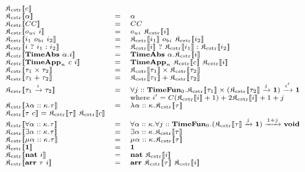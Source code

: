 \documentclass[fleqn]{article}
\begin{document}
\[
\scriptsize
\begin{array}{lcl}
    \cpsc{c} \\
    \cpsc{\alpha} & = & \alpha \\
    \cpsc{CC} & = & CC \\
    \cpsc{o_{ui}~i} & = & o_{ui}~\cpsc{i} \\
    \cpsc{i_1~o_{bi}~i_2} & = & \cpsc{i_1}~o_{bi}~\cpsc{i_2} \\
    \cpsc{i~?~i_1 : i_2} & = & \cpsc{i}~?~\cpsc{i_1} : \cpsc{i_2} \\
    \cpsc{\mathbf{TimeAbs}~\alpha.i} & = & \mathbf{TimeAbs}~\alpha.\cpsc{i} \\
    \cpsc{\mathbf{TimeApp}_n~c~i} & = & \mathbf{TimeApp}_n~\cpsc{c}~\cpsc{i} \\
    \cpsc{\tau_1 \times \tau_2} & = & \cpsc{\tau_1} \times \cpsc{\tau_2} \\
    \cpsc{\tau_1 + \tau_2} & = & \cpsc{\tau_1} + \cpsc{\tau_2} \\
    \cpsc{\tau_1 \xrightarrow{i} \tau_2} & = & \forall j :: \mathbf{TimeFun}_0. \cpsc{\tau_1} \times (\cpsc{\tau_2} \xrightarrow{j} \mathbf{1}) \xrightarrow{i'} \mathbf{1} \\
    & & \mathrm{where}~i'= C(\cpsc{i}+1) + 2\cpsc{i} + 1 + j \\
    \cpsc{\lambda \alpha :: \kappa. \tau} & = & \lambda \alpha :: \kappa. \cpsc{\tau} \\
    \cpsc{\tau~c} = \cpsc{\tau}~\cpsc{c} \\
    \cpsc{\forall \alpha :: \kappa. \tau} & = & \forall \alpha :: \kappa. \forall j :: \mathbf{TimeFun}_0. (\cpsc{\tau} \xrightarrow{j} \mathbf{1}) \xrightarrow{1 + j} \mathbf{void} \\
    \cpsc{\exists \alpha :: \kappa. \tau} & = & \exists \alpha :: \kappa. \cpsc{\tau} \\
    \cpsc{\mu \alpha :: \kappa. \tau} & = & \mu \alpha :: \kappa. \cpsc{\tau} \\
    \cpsc{\mathbf{1}} & = & \mathbf{1} \\
    \cpsc{\mathbf{nat}~i} & = & \mathbf{nat}~\cpsc{i} \\
    \cpsc{\mathbf{arr}~\tau~i} & = & \mathbf{arr}~\cpsc{\tau}~\cpsc{i}
\end{array}
\]

\newcommand{\jty}[4]{#1 \vdash #2 : #3 \triangleright #4}
\newcommand{\jtyc}[3]{#1 \vdash #2 : #3}
\end{document}
